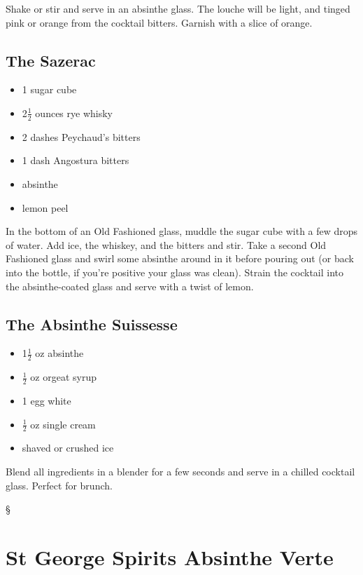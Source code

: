 \documentclass[12pt,letterpaper,oneside]{memoir}
\newcommand\secdiv{
  \begin{center}
    \S
  \end{center}
}
\begin{document}
  Shake or stir and serve in an absinthe glass.  The louche will be light, and tinged pink or orange from the cocktail bitters.  Garnish with a slice of orange.

  \newpage

  \subsection*{The Sazerac}

  \begin{itemize}[noitemsep]
    \item 1 sugar cube
    \item 2$\frac{1}{2}$ ounces rye whisky
    \item 2 dashes Peychaud's bitters
    \item 1 dash Angostura bitters
    \item absinthe
    \item lemon peel
  \end{itemize}

  In the bottom of an Old Fashioned glass, muddle the sugar cube with a few drops of water.  Add ice, the whiskey, and the bitters and stir.  Take a second Old Fashioned glass and swirl some absinthe around in it before pouring out (or back into the bottle, if you're positive your glass was clean).  Strain the cocktail into the absinthe-coated glass and serve with a twist of lemon.

  \subsection*{The Absinthe Suissesse}

  \begin{itemize}[noitemsep]
    \item 1$\frac{1}{2}$ oz absinthe
    \item $\frac{1}{2}$ oz orgeat syrup
    \item 1 egg white
    \item $\frac{1}{2}$ oz single cream
    \item shaved or crushed ice
  \end{itemize}

  Blend all ingredients in a blender for a few seconds and serve in a chilled cocktail glass.  Perfect for brunch.

  \secdiv

  \section*{St George Spirits Absinthe Verte}
\end{document}
